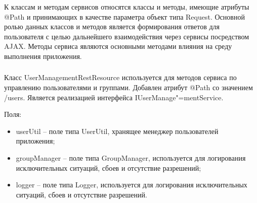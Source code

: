 К классам и методам сервисов относятся классы и методы, имеющие атрибуты @Path и принимающих в качестве параметра объект типа Request. Основной ролью данных классов и методов является формирования ответов для пользователя с целью дальнейшего взаимодействия через сервисы посредством AJAX. Методы сервиса являются основными методами влияния на среду выполнения приложения.

\subsubsection{}
\label{sub:arch_and_mod:application_server_layer:user-management-rest-resource}

Класс UserManagementRestResource используется для методов сервиса по управлению пользователями и группами. Добавлен атрибут @Path со значением /users. Является реализацией интерфейса IUserManage"=mentService.

Поля:
\begin{itemize}
  \item userUtil – поле типа UserUtil, хранящее менеджер пользователей приложения;
  \item groupManager – поле типа GroupManager, используется для логирования исключительных ситуаций, сбоев и отсутствие разрешений;
  \item logger – поле типа Logger, используется для логирования исключительных ситуаций, сбоев и отсутствие разрешений.
\end{itemize}

